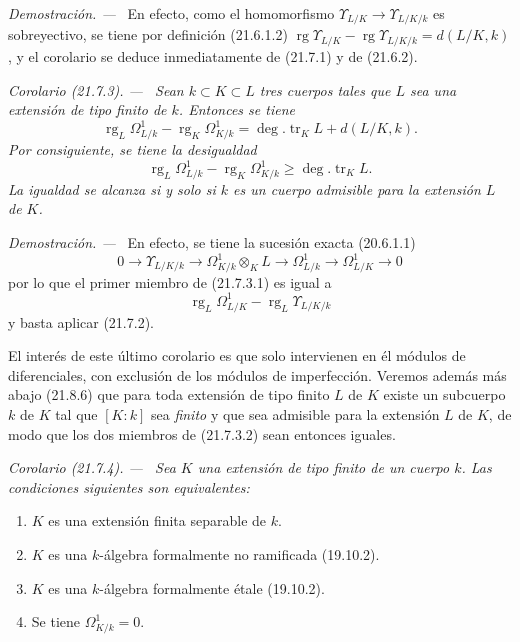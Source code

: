 \documentclass[10pt,oneside]{book}
\makeatletter
\newcommand{\setmanualcurrentlabel}[1]{\def\@currentlabel{#1}}
\newcommand{\oldpage}[2][]{%
  \setcounter{footnote}{0}%
  \marginpar{\scriptsize\textbf{#1}~|~#2}\ignorespaces}
\newenvironment{corollary}[1][]{%
  \setmanualcurrentlabel{#1}\par\medskip\noindent\itshape Corolario (#1). ---\ }{\par}
\newenvironment{proof}{%
  \par\medskip\noindent\textit{Demostración. ---\ }}{\par}
\providecommand{\setmin}{-}%
\makeatother
\begin{document}
\begin{proof}
En efecto, como el homomorfismo
$\Upsilon_{L/K}\to\Upsilon_{L/K/k}$ es sobreyectivo, se tiene por definición
(21.6.1.2) $\operatorname{rg}\Upsilon_{L/K}\setmin\operatorname{rg}\Upsilon_{L/K/k}
=d(L/K,k)$, y el corolario se deduce inmediatamente de (21.7.1) y de
(21.6.2).
\end{proof}

\begin{corollary}[21.7.3]
\label{0.21.7.3-es}
Sean $k\subset K\subset L$ tres cuerpos tales que $L$ sea una extensión de
tipo finito de $k$. Entonces se tiene
\begin{equation}
\tag{21.7.3.1}
\label{0.21.7.3.1-es}
\operatorname{rg}_L\Omega^1_{L/k}\setmin\operatorname{rg}_K\Omega^1_{K/k}
=\deg.\operatorname{tr}_K L+d(L/K,k).
\end{equation}
\oldpage[0\textsubscript{IV-1}]{171}
Por consiguiente, se tiene la desigualdad
\begin{equation}
\tag{21.7.3.2}
\label{0.21.7.3.2-es}
\operatorname{rg}_L\Omega^1_{L/k}-\operatorname{rg}_K\Omega^1_{K/k}
\geqslant\deg.\operatorname{tr}_K L.
\end{equation}
La igualdad se alcanza si y solo si $k$ es un cuerpo admisible para
la extensión $L$ de $K$.
\end{corollary}

\begin{proof}
En efecto, se tiene la sucesión exacta (20.6.1.1)
\[
0\to\Upsilon_{L/K/k}\to\Omega^1_{K/k}\otimes_KL\to\Omega^1_{L/k}
\to\Omega^1_{L/K}\to0
\]
por lo que el primer miembro de (21.7.3.1) es igual a
\[
\operatorname{rg}_L\Omega^1_{L/K}-\operatorname{rg}_L\Upsilon_{L/K/k}
\]
y basta aplicar (21.7.2).
\end{proof}

El interés de este último corolario es que solo intervienen en él módulos de
diferenciales, con exclusión de los módulos de imperfección. Veremos además más
abajo (21.8.6) que para toda extensión de tipo finito $L$ de $K$ existe un
subcuerpo $k$ de $K$ tal que $[K:k]$ sea \emph{finito} y que sea admisible para la
extensión $L$ de $K$, de modo que los dos miembros de (21.7.3.2) sean entonces
iguales.

\begin{corollary}[21.7.4]
\label{0.21.7.4-es}
Sea $K$ una extensión de tipo finito de un cuerpo $k$. Las condiciones siguientes
son equivalentes:
\begin{enumerate}
  \item[\rm a)] $K$ es una extensión finita separable de $k$.
  \item[\rm b)] $K$ es una $k$-álgebra formalmente no ramificada \textup{(19.10.2)}.
  \item[\rm c)] $K$ es una $k$-álgebra formalmente étale \textup{(19.10.2)}.
  \item[\rm d)] Se tiene $\Omega^1_{K/k}=0$.
\end{enumerate}
\end{corollary}
\end{document}
